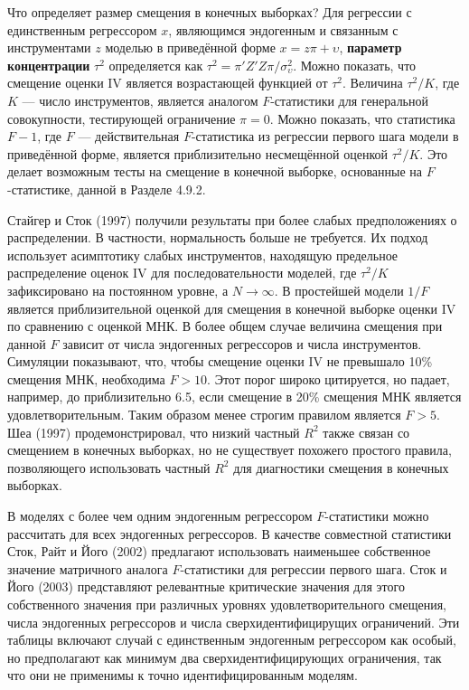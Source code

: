 Что определяет размер смещения в конечных выборках? Для регрессии с единственным регрессором $x$, являющимся эндогенным и связанным с инструментами $z$ моделью в приведённой форме $x = z\pi +\upsilon$, \textbf{параметр концентрации} $\tau^2$ определяется как $\tau^2 = \pi'Z'Z\pi/\sigma^2_\upsilon$. Можно показать, что смещение оценки IV является возрастающей функцией от $\tau^2$. Величина $\tau^2/K$, где $K$ --- число инструментов, является аналогом $F$-статистики для генеральной совокупности, тестирующей ограничение $\pi=0$. Можно показать, что статистика $F-1$, где $F$ --- действительная $F$-статистика из регрессии первого шага модели в приведённой форме, является приблизительно несмещённой оценкой $\tau^2/K$. Это делает возможным тесты на смещение в конечной выборке, основанные на $F$-статистике, данной в Разделе 4.9.2.

Стайгер и Сток (1997) получили результаты при более слабых предположениях о распределении. В частности, нормальность больше не требуется. Их подход использует асимптотику слабых инструментов, находящую предельное распределение оценок IV  для последовательности моделей, где $\tau^2/K$ зафиксировано на постоянном уровне, а $N\longrightarrow \infty$. В простейшей модели $1/F$ является приблизительной оценкой для смещения в конечной выборке оценки IV по сравнению с оценкой МНК. В более общем случае величина смещения при данной $F$ зависит от числа эндогенных регрессоров и числа инструментов. Симуляции показывают, что, чтобы   смещение оценки IV не превышало 10\% смещения МНК, необходима $F>10$. Этот порог широко цитируется, но падает, например, до приблизительно 6.5, если смещение в 20\% смещения МНК является удовлетворительным. Таким образом менее строгим правилом является $F>5$. Шеа (1997) продемонстрировал, что низкий частный $R^2$ также связан со смещением в конечных выборках, но не существует похожего простого правила, позволяющего использовать частный $R^2$ для диагностики смещения в конечных выборках.

В моделях с более чем одним эндогенным регрессором $F$-статистики можно рассчитать для всех эндогенных регрессоров. В качестве совместной статистики Сток, Райт и Його (2002) предлагают использовать наименьшее собственное значение матричного аналога $F$-статистики для регрессии первого шага. Сток и Його (2003) представляют релевантные критические значения для этого собственного значения при различных уровнях удовлетворительного смещения, числа эндогенных регрессоров и числа сверхидентифицирущих ограничений. Эти таблицы включают случай с единственным эндогенным регрессором как особый, но предполагают как минимум два сверхидентифицирующих ограничения, так что они не применимы к точно идентифицированным моделям. 

